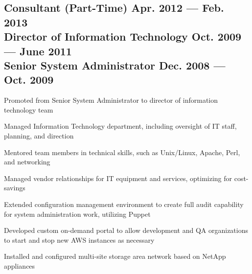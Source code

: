 \documentclass[letter,10pt]{article}
\begin{document}
\subsection{Consultant (Part-Time) \hfill Apr. 2012 --- Feb.  2013\\
	Director of Information Technology \hfill Oct. 2009 --- June 2011\\
	Senior System Administrator \hfill Dec. 2008 --- Oct. 2009}
\begin{zitemize}
	\item Promoted from Senior System Administrator to director of
	information technology team
	\item Managed Information Technology department, including
	oversight of IT staff, planning, and direction
	\item Mentored team members in technical skills, such as
	Unix/Linux, Apache, Perl, and networking
	\item Managed vendor relationships for IT equipment and
	services, optimizing for cost-savings
	\item Extended configuration management environment to create
	full audit capability for system administration work,
	utilizing Puppet
	\item Developed custom on-demand portal to allow development and
	QA organizations to start and stop new AWS instances as
	necessary
	\item Installed and configured multi-site storage area network
	based on NetApp appliances
\end{zitemize}

\end{document}
